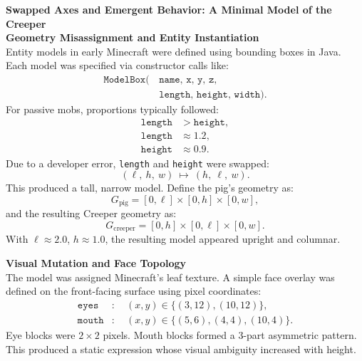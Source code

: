 \begin{technical}
{\Large\textbf{Swapped Axes and Emergent Behavior: A Minimal Model of the Creeper}}\\[0.7em]

\noindent\textbf{Geometry Misassignment and Entity Instantiation}\\[0.5em]
Entity models in early Minecraft were defined using bounding boxes in Java. 
Each model was specified via constructor calls like:
\[
\begin{aligned}
\texttt{ModelBox(}&\,\texttt{name,\ x,\ y,\ z,} \\
                &\,\texttt{length,\ height,\ width)}.
\end{aligned}
\]
For passive mobs, proportions typically followed:
\begin{align*}
\texttt{length} &> \texttt{height}, \\
\texttt{length} &\approx 1.2, \\
\texttt{height} &\approx 0.9.
\end{align*}
Due to a developer error, \texttt{length} and \texttt{height} were swapped:
\[
(\ell,\ h,\ w)\ \mapsto\ (h,\ \ell,\ w).
\]
This produced a tall, narrow model. Define the pig’s geometry as:
\[
G_{\text{pig}} = [0,\ell] \times [0,h] \times [0,w],
\]
and the resulting Creeper geometry as:
\[
G_{\text{creeper}} = [0,h] \times [0,\ell] \times [0,w].
\]
With \( \ell \approx 2.0 \), \( h \approx 1.0 \), the resulting model appeared upright and columnar.


\vspace{0.3em}
\noindent\textbf{Visual Mutation and Face Topology}\\[0.5em]
The model was assigned Minecraft’s leaf texture. A simple face overlay was defined
on the front-facing surface using pixel coordinates:
\begin{align*}
\texttt{eyes} &:\quad (x,y) \in \{(3,12), (10,12)\}, \\
\texttt{mouth} &:\quad (x,y) \in \{(5,6), (4,4), (10,4)\}.
\end{align*}
Eye blocks were \(2 \times 2\) pixels. Mouth blocks formed a 3-part asymmetric pattern.
This produced a static expression whose visual ambiguity increased with height.


\end{technical}
